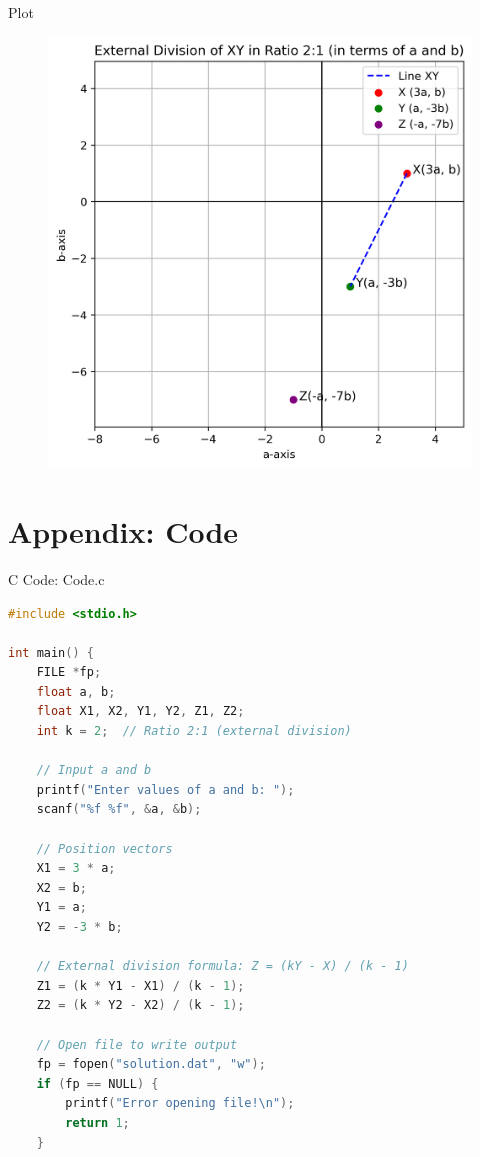 \documentclass{beamer}
\numberwithin{equation}{section}
\theoremstyle{remark}
\begin{document}
\begin{frame}{Plot}
    \begin{figure}[H]
    \centering
    \includegraphics[width=0.71\columnwidth]{figs/01.png}
    \label{fig-1}
\end{figure}
\end{frame}

\section*{Appendix: Code}

\begin{frame}[fragile]{C Code: Code.c}
\begin{lstlisting}[language=C]
#include <stdio.h>

int main() {
    FILE *fp;
    float a, b;
    float X1, X2, Y1, Y2, Z1, Z2;
    int k = 2;  // Ratio 2:1 (external division)

    // Input a and b
    printf("Enter values of a and b: ");
    scanf("%f %f", &a, &b);

    // Position vectors
    X1 = 3 * a;
    X2 = b;
    Y1 = a;
    Y2 = -3 * b;

    // External division formula: Z = (kY - X) / (k - 1)
    Z1 = (k * Y1 - X1) / (k - 1);
    Z2 = (k * Y2 - X2) / (k - 1);

    // Open file to write output
    fp = fopen("solution.dat", "w");
    if (fp == NULL) {
        printf("Error opening file!\n");
        return 1;
    }
 \end{lstlisting}
\end{frame}
\end{document}
